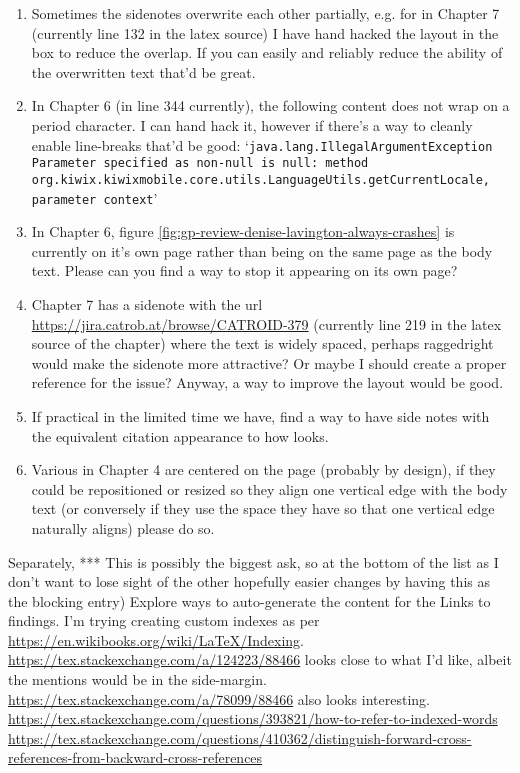\begin{enumerate}
    \item Sometimes the sidenotes overwrite each other partially, e.g. for  in Chapter 7 (currently line 132 in the latex source) I have hand hacked the layout in the box to reduce the overlap. If you can easily and reliably reduce the ability of the overwritten text that'd be great.
    \item In Chapter 6 (in line 344 currently), the following  content does not wrap on a period character. I can hand hack it, however if there's a way to cleanly enable line-breaks that'd be good: `\texttt{java.lang.IllegalArgumentException Parameter specified as non-null is null: method org.kiwix.kiwixmobile.core.utils.LanguageUtils.getCurrentLocale, parameter context}'
    \item In Chapter 6, figure \ref{fig:gp-review-denise-lavington-always-crashes} is currently on it's own page rather than being on the same page as the body text. Please can you find a way to stop it appearing on its own page?  
    \item Chapter 7 has a sidenote with the url \url{https://jira.catrob.at/browse/CATROID-379} (currently line 219 in the latex source of the chapter) where the text is widely spaced, perhaps raggedright would make the sidenote more attractive? Or maybe I should create a proper reference for the issue? Anyway, a way to improve the layout would be good.
    \item If practical in the limited time we have, find a way to have side notes with the equivalent citation appearance to how  looks.
    \item Various  in Chapter 4 are centered on the page (probably by design), if they could be repositioned or resized so they align one vertical edge with the body text (or conversely if they use the space they have so that one vertical edge naturally aligns) please do so. 
\end{enumerate}

Separately, *** This is possibly the biggest ask, so at the bottom of the list as I don't want to lose sight of the other hopefully easier changes by having this as the blocking entry) Explore ways to auto-generate the content for the Links to findings. I'm trying creating custom indexes as per \url{https://en.wikibooks.org/wiki/LaTeX/Indexing}. \url{https://tex.stackexchange.com/a/124223/88466} looks close to what I'd like, albeit the mentions would be in the side-margin. \url{https://tex.stackexchange.com/a/78099/88466} also looks interesting. \url{https://tex.stackexchange.com/questions/393821/how-to-refer-to-indexed-words} \url{https://tex.stackexchange.com/questions/410362/distinguish-forward-cross-references-from-backward-cross-references}

